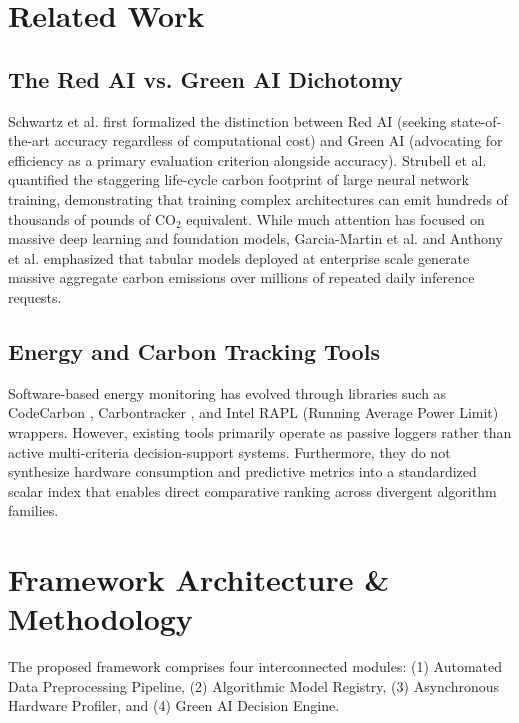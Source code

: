 \documentclass[conference]{IEEEtran}
\begin{document}
\section{Related Work}
\subsection{The Red AI vs. Green AI Dichotomy}
Schwartz et al. \cite{schwartz2020green} first formalized the distinction between Red AI (seeking state-of-the-art accuracy regardless of computational cost) and Green AI (advocating for efficiency as a primary evaluation criterion alongside accuracy). Strubell et al. \cite{strubell2019energy} quantified the staggering life-cycle carbon footprint of large neural network training, demonstrating that training complex architectures can emit hundreds of thousands of pounds of $\text{CO}_2$ equivalent. While much attention has focused on massive deep learning and foundation models, Garcia-Martin et al. \cite{garcia2019estimation} and Anthony et al. \cite{anthony2020carbontracker} emphasized that tabular models deployed at enterprise scale generate massive aggregate carbon emissions over millions of repeated daily inference requests.

\subsection{Energy and Carbon Tracking Tools}
Software-based energy monitoring has evolved through libraries such as CodeCarbon \cite{codecarbon}, Carbontracker \cite{anthony2020carbontracker}, and Intel RAPL (Running Average Power Limit) wrappers. However, existing tools primarily operate as passive loggers rather than active multi-criteria decision-support systems. Furthermore, they do not synthesize hardware consumption and predictive metrics into a standardized scalar index that enables direct comparative ranking across divergent algorithm families.

\section{Framework Architecture \& Methodology}
The proposed framework comprises four interconnected modules: (1) Automated Data Preprocessing Pipeline, (2) Algorithmic Model Registry, (3) Asynchronous Hardware Profiler, and (4) Green AI Decision Engine.
\end{document}
